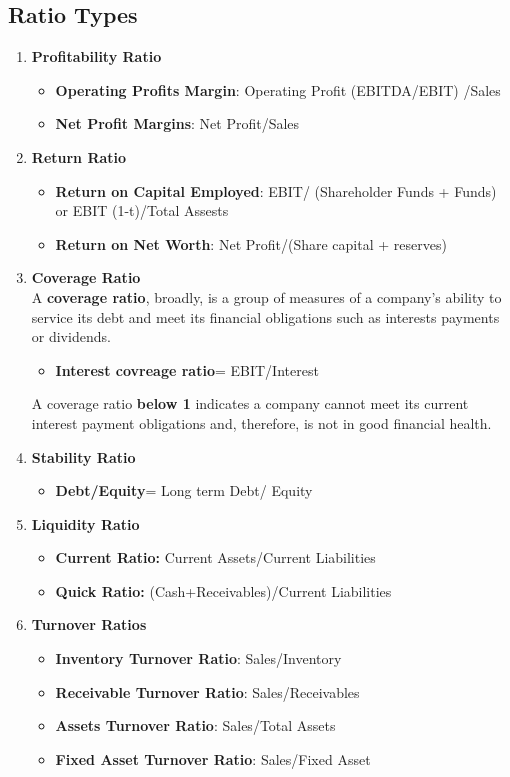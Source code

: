 \documentclass{article}
\begin{document}
\subsection{Ratio Types}
\begin{enumerate}
    \item \textbf{Profitability Ratio}
    \begin{itemize}
        \item \textbf{Operating Profits Margin}: Operating Profit (EBITDA/EBIT) /Sales 
        \item \textbf{Net Profit Margins}: Net Profit/Sales
    \end{itemize}
    \item \textbf{Return Ratio}
    \begin{itemize}
        \item \textbf{Return on Capital Employed}: EBIT/ (Shareholder Funds + Funds) or 
        EBIT (1-t)/Total Assests
        \item \textbf{Return on Net Worth}: Net Profit/(Share capital + reserves)
    \end{itemize}
    \item \textbf{Coverage Ratio}\\
    A \textbf{coverage ratio}, broadly, is a group of measures of a company's ability to service its debt and meet its financial obligations such as interests payments or dividends.
    \begin{itemize}
        \item \textbf{Interest covreage ratio}= EBIT/Interest
    \end{itemize}
    A coverage ratio \textbf{below 1} indicates a company cannot meet its current interest payment obligations and, therefore, is not in good financial health.
    \item \textbf{Stability Ratio}
    \begin{itemize}
        \item \textbf{Debt/Equity}= Long term Debt/ Equity
    \end{itemize}
    \item \textbf{Liquidity Ratio}
    \begin{itemize}
        \item \textbf{Current Ratio:} Current Assets/Current Liabilities
        \item \textbf{Quick Ratio:} (Cash+Receivables)/Current Liabilities
    \end{itemize}
    \item \textbf{Turnover Ratios}
    \begin{itemize}
        \item \textbf{Inventory Turnover Ratio}: Sales/Inventory
        \item \textbf{Receivable Turnover Ratio}: Sales/Receivables
        \item \textbf{Assets Turnover Ratio}: Sales/Total Assets
        \item \textbf{Fixed Asset Turnover Ratio}: Sales/Fixed Asset
    \end{itemize}
\end{enumerate}
\end{document}
